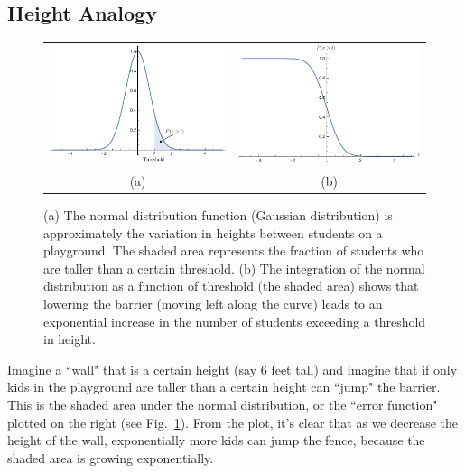 \subsection{Height Analogy}
\begin{figure}[tb]
\centering
\begin{tabular}{cc}
\includegraphics[width=.45\columnwidth]{norm4} &
\includegraphics[width=.45\columnwidth]{erf}\\
(a) & (b)\\
\end{tabular}
\caption{(a) The normal distribution function (Gaussian distribution) is approximately the variation in heights between students on a playground.  The shaded area represents the fraction of students who are taller than a certain threshold.  (b)  The integration of the normal distribution as a function of threshold (the shaded area) shows that lowering the barrier (moving left along the curve) leads to an exponential increase in the number of students exceeding a threshold in height.}
\label{fig:norm4}
\end{figure}
Imagine a ``wall" that is a certain height (say 6 feet tall) and imagine that if only kids in the playground are taller than a certain height can ``jump" the barrier.  This is the shaded area under the normal distribution, or the ``error function" plotted on the right (see Fig.~\ref{fig:norm4}).   From the plot, it's clear that as we decrease the height of the wall, exponentially more kids can jump the fence, because the shaded area is growing exponentially.  
